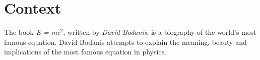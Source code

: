 %

\chapter{Context}
The book \emph{E = mc$^2$}, written by \emph{David Bodanis}, is a biography of the world's most famous equation.
David Bodanis attempts to explain the meaning, beauty and implications of the most famous equation in physics.